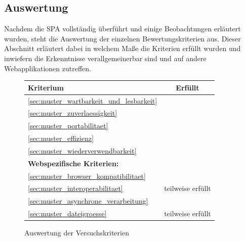 \subsection{Auswertung}
\label{sec:Auswertung}
Nachdem die \ac{SPA} vollständig überführt und einige Beobachtungen erläutert wurden, steht die Auswertung der einzelnen Bewertungskriterien aus. Dieser Abschnitt erläutert dabei in welchem Maße die Kriterien erfüllt wurden und inwiefern die Erkenntnisse verallgemeinerbar sind und auf andere Webapplikationen zutreffen.
\begin{figure}[htb]
\centering
\begin{tabular}{ | p{8cm} | c | }
	\hline
	\textbf{Kriterium} & \textbf{Erfüllt}\\
	\hline
	\ref{sec:muster_wartbarkeit_und_lesbarkeit} \nameref{sec:muster_wartbarkeit_und_lesbarkeit} & \checkmark\\
	\hline
	\ref{sec:muster_zuverlaessigkeit} \nameref{sec:muster_zuverlaessigkeit} & \checkmark\\
	\hline
	\ref{sec:muster_portabilitaet} \nameref{sec:muster_portabilitaet} & \checkmark\\
	\hline
	\ref{sec:muster_effizienz} \nameref{sec:muster_effizienz} & \checkmark\\
	\hline
	\ref{sec:muster_wiederverwendbarkeit} \nameref{sec:muster_wiederverwendbarkeit} & \checkmark\\
	\hline
	\multicolumn{2}{|l|}{\textbf{Webspezifische Kriterien:}} \\
	\hline
	\ref{sec:muster_browser_kompatibilitaet} \nameref{sec:muster_browser_kompatibilitaet} & \checkmark\\
	\hline
	\ref{sec:muster_interoperabilitaet} \nameref{sec:muster_interoperabilitaet} & teilweise erfüllt\\
	\hline
	\ref{sec:muster_asynchrone_verarbeitung} \nameref{sec:muster_asynchrone_verarbeitung} & \checkmark\\
	\hline
	\ref{sec:muster_dateigroesse} \nameref{sec:muster_dateigroesse} & teilweise erfüllt\\
	\hline
\end{tabular}
\caption{Auswertung der Versuchskriterien}
\label{fig:Auswertungstabelle}
\end{figure}

